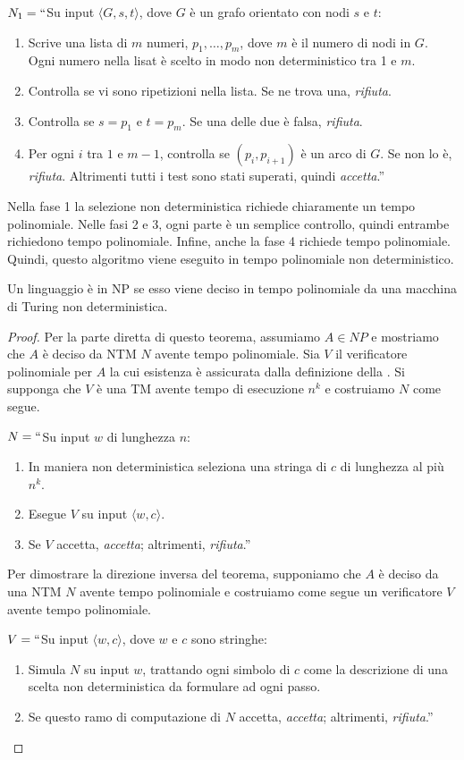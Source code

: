 \documentclass[12pt]{report}
\newcounter{theorem}
\begin{document}
$N_1 = ``$Su input $\langle G, s, t \rangle$, dove $G$ è un grafo orientato con nodi $s$ e $t$:
\begin{enumerate}
	\item Scrive una lista di $m$ numeri, $p_1, \dots, p_m$, dove $m$ è il numero di nodi in $G$. Ogni numero nella lisat è scelto in modo non deterministico tra 1 e $m$.
	\item Controlla se vi sono ripetizioni nella lista. Se ne trova una, \textit{rifiuta}.
	\item Controlla se $s = p_1$ e $t = p_m$. Se una delle due è falsa, \textit{rifiuta}.
	\item Per ogni $i$ tra $1$ e $m-1$, controlla se $(p_i, p_{i+1})$ è un arco di $G$. Se non lo è, \textit{rifiuta}. Altrimenti tutti i test sono stati superati, quindi \textit{accetta}.''
\end{enumerate}
Nella fase 1 la selezione non deterministica richiede chiaramente un tempo polinomiale. Nelle fasi 2 e 3, ogni parte è un semplice controllo, quindi entrambe richiedono tempo polinomiale. Infine, anche la fase 4 richiede tempo polinomiale. Quindi, questo algoritmo viene eseguito in tempo polinomiale non deterministico.
\begin{theorem}{}{}
Un linguaggio è in NP se esso viene deciso in tempo polinomiale da una macchina di Turing non deterministica.
\end{theorem}
\begin{proof}
	Per la parte diretta di questo teorema, assumiamo $A \in NP$ e mostriamo che $A$ è deciso da NTM $N$ avente tempo polinomiale. Sia $V$ il verificatore polinomiale per $A$ la cui esistenza è assicurata dalla definizione della \textit{}. Si supponga che $V$ è una TM avente tempo di esecuzione $n^k$ e costruiamo $N$ come segue.

$N = ``$Su input $w$ di lunghezza $n$:
\begin{enumerate}
	\item In maniera non deterministica seleziona una stringa di $c$ di lunghezza al più $n^k$.
	\item Esegue $V$ su input $\langle w, c \rangle$.
	\item Se $V$ accetta, \textit{accetta}; altrimenti, \textit{rifiuta}.''
\end{enumerate}
Per dimostrare la direzione inversa del teorema, supponiamo che $A$ è deciso da una NTM $N$ avente tempo polinomiale e costruiamo come segue un verificatore $V$ avente tempo polinomiale.

$V = ``$Su input $\langle w, c \rangle$, dove $w$ e $c$ sono stringhe:
\begin{enumerate}
	\item Simula $N$ su input $w$, trattando ogni simbolo di $c$ come la descrizione di una scelta non deterministica da formulare ad ogni passo.
	\item Se questo ramo di computazione di $N$ accetta, \textit{accetta}; altrimenti, \textit{rifiuta}.''
\end{enumerate}
\end{proof}
\end{document}
